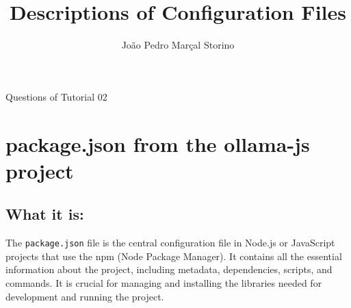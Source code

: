 \documentclass{article}
\title{Descriptions of Configuration Files}
\author{João Pedro Marçal Storino}
\begin{document}
\maketitle
Questions of Tutorial 02

\section{package.json from the ollama-js project}

\subsection{What it is:}
The \texttt{package.json} file is the central configuration file in Node.js or JavaScript projects that use the npm (Node Package Manager). It contains all the essential information about the project, including metadata, dependencies, scripts, and commands. It is crucial for managing and installing the libraries needed for development and running the project.
\end{document}
